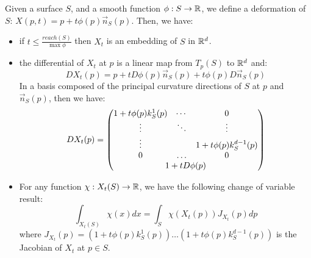 \begin{lemma}
    \label{lemma:deformation}

    Given a surface $ S $, and a smooth function $ \phi : S \to \mathbb{R} $, we define a
    deformation of $ S $: $ X(p, t) = p + t \phi(p) \vec{n}_S(p) $. Then, we
    have:

    \begin{itemize}
        \item if $ t \leq \frac{reach(S)}{\max \phi} $ then $ X_t $ is an
            embedding of $ S $ in $ \mathbb{R}^d $.
        \item the differential of $ X_t $ at $ p $ is a linear map from $ T_p(S)
            $ to $ \mathbb{R}^d $ and:
            \begin{equation}
                D X_t(p) = p + t D \phi(p) \vec{n}_S(p) + t \phi(p) D \vec{n}_S(p)
            \end{equation}
            In a basis composed of the principal curvature directions of $ S $
            at $ p $ and $ \vec{n}_S(p) $, then we have:
            \begin{equation}
                D X_t(p) =
                \begin{pmatrix}
                    1 + t \phi(p) k^1_S(p) & \cdots & 0 \\
                    \vdots                 & \ddots & \vdots                      \\
                    \vdots                 &        & 1 + t \phi(p) k^{d-1}_S(p)  \\
                    0                      & \hdots & 0                           \\
                    \multicolumn{3}{c}{1 + t D\phi(p)} \\
                \end{pmatrix}
            \end{equation}
        \item For any function $ \chi : X_t(S) \to \mathbb{R} $, we have the following
            change of variable result:
            \begin{equation}
                \int_{X_t(S)} \chi(x) dx = \int_S \chi(X_t(p)) J_{X_t}(p) dp
            \end{equation}
            where $ J_{X_t}(p) = (1 + t \phi(p) k^1_S(p)) \hdots (1 + t \phi(p)
            k^{d-1}_S(p)) $ is the Jacobian of $ X_t $ at $ p \in S $.
    \end{itemize}
\end{lemma}

